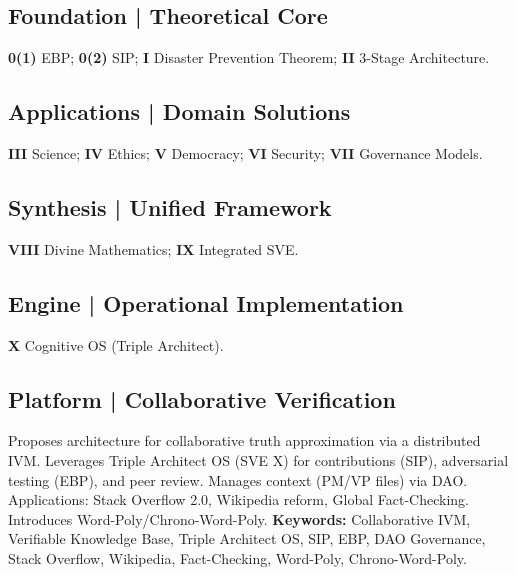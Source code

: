 \documentclass[11pt,a4paper]{article}
\theoremstyle{definition}
\theoremstyle{remark}
\begin{document}
\begin{small}
\subsection*{\textcolor{sveblue}{Foundation | Theoretical Core}}
\textbf{0(1)} EBP; \textbf{0(2)} SIP; \textbf{I} Disaster Prevention Theorem; \textbf{II} 3-Stage Architecture.
\subsection*{\textcolor{sveteal}{Applications | Domain Solutions}}
\textbf{III} Science; \textbf{IV} Ethics; \textbf{V} Democracy; \textbf{VI} Security; \textbf{VII} Governance Models.
\subsection*{\textcolor{sveblue}{Synthesis | Unified Framework}}
\textbf{VIII} Divine Mathematics; \textbf{IX} Integrated SVE.
\subsection*{\textcolor{red!70!black}{Engine | Operational Implementation}}
\textbf{X} Cognitive OS (Triple Architect).
\subsection*{\textcolor{svered!80!black}{Platform | Collaborative Verification}}
\begin{description}[leftmargin=1cm, style=nextline, itemsep=0.5em]
    \item[\textbf{S.V.E. XI: The Ox's Weights}] Proposes architecture for collaborative truth approximation via a distributed IVM. Leverages Triple Architect OS (SVE X) for contributions (SIP), adversarial testing (EBP), and peer review. Manages context (PM/VP files) via DAO. Applications: Stack Overflow 2.0, Wikipedia reform, Global Fact-Checking. Introduces Word-Poly/Chrono-Word-Poly. \smallskip
    \noindent\textbf{Keywords:} Collaborative IVM, Verifiable Knowledge Base, Triple Architect OS, SIP, EBP, DAO Governance, Stack Overflow, Wikipedia, Fact-Checking, Word-Poly, Chrono-Word-Poly.
\end{description}
\end{small}

\clearpage

\tableofcontents
\clearpage
\setcounter{page}{1}
\end{document}
